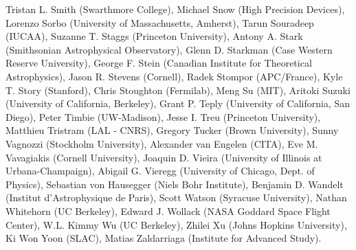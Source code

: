 Tristan L. Smith (Swarthmore College),
Michael Snow (High Precision Devices),
Lorenzo Sorbo (University of Massachusetts, Amherst),
Tarun Souradeep (IUCAA),
Suzanne T. Staggs (Princeton University),
Antony A. Stark (Smithsonian Astrophysical Observatory),
Glenn D. Starkman (Case Western Reserve University),
George F. Stein (Canadian Institute for Theoretical Astrophysics),
Jason R. Stevens (Cornell),
Radek Stompor (APC/France),
Kyle T. Story (Stanford),
Chris Stoughton (Fermilab),
Meng Su (MIT),
Aritoki Suzuki (University of California, Berkeley),
Grant P. Teply (University of California, San Diego),
Peter Timbie (UW-Madison),
Jesse I. Treu (Princeton University),
Matthieu Tristram (LAL - CNRS),
Gregory Tucker (Brown University),
Sunny Vagnozzi (Stockholm University),
Alexander van Engelen (CITA),
Eve M. Vavagiakis (Cornell University),
Joaquin D. Vieira (University of Illinois at Urbana-Champaign),
Abigail G. Vieregg (University of Chicago, Dept. of Physics),
Sebastian von Hausegger (Niels Bohr Institute),
Benjamin D. Wandelt (Institut d'Astrophysique de Paris),
Scott Watson (Syracuse University),
Nathan Whitehorn (UC Berkeley),
Edward J. Wollack (NASA Goddard Space Flight Center),
W.L. Kimmy Wu (UC Berkeley),
Zhilei Xu (Johns Hopkins University),
Ki Won Yoon (SLAC),
Matias Zaldarriaga (Institute for Advanced Study).
